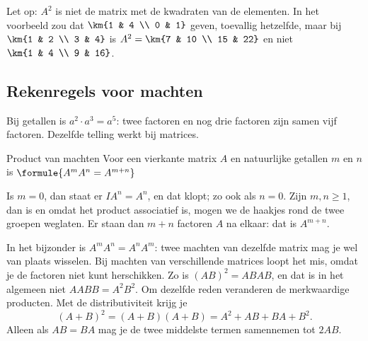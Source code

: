 Let op: $A^2$ is niet de matrix met de kwadraten van de elementen. In het voorbeeld zou dat $\km{1 & 4 \\ 0 & 1}$ geven, toevallig hetzelfde, maar bij $\km{1 & 2 \\ 3 & 4}$ is $A^2 = \km{7 & 10 \\ 15 & 22}$ en niet $\km{1 & 4 \\ 9 & 16}$.


\begin{oefeningen}
\end{oefeningen}

\subsection{Rekenregels voor machten}

Bij getallen is $a^2 \cdot a^3 = a^5$: twee factoren en nog drie factoren zijn samen vijf factoren. Dezelfde telling werkt bij matrices.

\begin{theorie}
\begin{stelling}{Product van machten}
Voor een vierkante matrix $A$ en natuurlijke getallen $m$ en $n$ is \qquad $\formule{A^m A^n = A^{m+n}}$
\end{stelling}

\begin{bewijs}
Is $m = 0$, dan staat er $IA^n = A^n$, en dat klopt; zo ook als $n = 0$. Zijn $m, n \geqslant 1$, dan is
en omdat het product associatief is, mogen we de haakjes rond de twee groepen weglaten. Er staan dan $m + n$ factoren $A$ na elkaar: dat is $A^{m+n}$.
\end{bewijs}
\end{theorie}

In het bijzonder is $A^m A^n = A^n A^m$: twee machten van dezelfde matrix mag je wel van plaats wisselen. Bij machten van verschillende matrices loopt het mis, omdat je de factoren niet kunt herschikken. Zo is $(AB)^2 = ABAB$, en dat is in het algemeen niet $AABB = A^2B^2$. Om dezelfde reden veranderen de merkwaardige producten. Met de distributiviteit krijg je
\[ (A + B)^2 = (A + B)(A + B) = A^2 + AB + BA + B^2 . \]
Alleen als $AB = BA$ mag je de twee middelste termen samennemen tot $2AB$.

